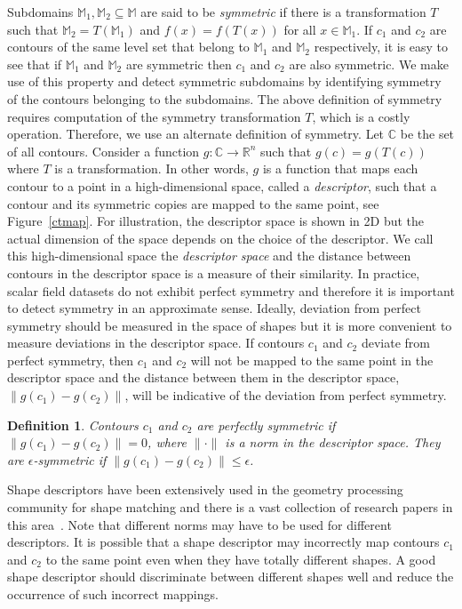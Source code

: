 \documentclass[review,journal]{vgtc}         %
\newtheorem*{defi}{Definition}
\begin{document}
Subdomains $\mathbb{M}_1, \mathbb{M}_2 \subseteq \mathbb{M}$ are said to be \emph{symmetric} 
if there is a transformation $T$ such that ${\mathbb{M}_2=T(\mathbb{M}_1)}$ and 
${f(x)=f(T(x))}$ for all $x \in \mathbb{M}_1$. If $c_1$ and $c_2$ are contours of the same level
set that belong to $\mathbb{M}_1$ and $\mathbb{M}_2$ respectively, it is easy to see that if 
$\mathbb{M}_1$ and $\mathbb{M}_2$ are symmetric then $c_1$ and $c_2$ are also symmetric. 
We make use of this property and detect symmetric subdomains by identifying symmetry of the 
contours belonging to the subdomains. The above definition of symmetry requires computation of the symmetry 
transformation $T$, which is a costly operation. Therefore, we use an alternate definition of symmetry.
Let $\mathbb{C}$ be the set of all contours. 
Consider a function $g : \mathbb{C} \rightarrow \mathbb{R}^n$ such that $g(c) = g(T(c))$
where $T$ is a transformation. In other words, $g$ is a function that maps each
contour to a point in a high-dimensional space, called a \emph{descriptor}, 
such that a contour and its symmetric copies are mapped to the same point, see Figure~\ref{ctmap}.
For illustration, the descriptor space is shown in 2D but the actual dimension of the space
depends on the choice of the descriptor. We call this high-dimensional space the
\emph{descriptor space} and the distance between contours in the descriptor space is a
measure of their similarity. In practice, scalar field datasets do not exhibit perfect symmetry and therefore
it is important to detect symmetry in an approximate sense. Ideally, deviation
from perfect symmetry should be measured in the space of shapes but 
it is more convenient to measure deviations in the descriptor space. If contours $c_1$ and 
$c_2$ deviate from perfect symmetry, then $c_1$ and $c_2$ will not be mapped
to the same point in the descriptor space and the distance between
them in the descriptor space, $\lVert g(c_1)-g(c_2) \rVert$, will be indicative
of the deviation from perfect symmetry. 
\begin{defi}
Contours $c_1$ and $c_2$ are perfectly symmetric if $\lVert g(c_1)-g(c_2) \rVert = 0$,
where $\lVert \cdot \rVert$ is a norm in the descriptor space. They are 
{$\epsilon$-symmetric} if $\lVert g(c_1)-g(c_2) \rVert \leq \epsilon$.
\end{defi}
Shape descriptors have been extensively used in the
geometry processing community for shape matching and there is a
vast collection of research papers in this 
area~\cite{lian2013,van2011,tangelder2008survey,qin2008content}. Note that
different norms may have to be used for different descriptors. 
It is possible that a shape descriptor may incorrectly map contours $c_1$ and 
$c_2$ to the same point even when they have totally different shapes. A good shape descriptor should 
discriminate between different shapes well and reduce the occurrence of such incorrect
mappings. 
\end{document}

